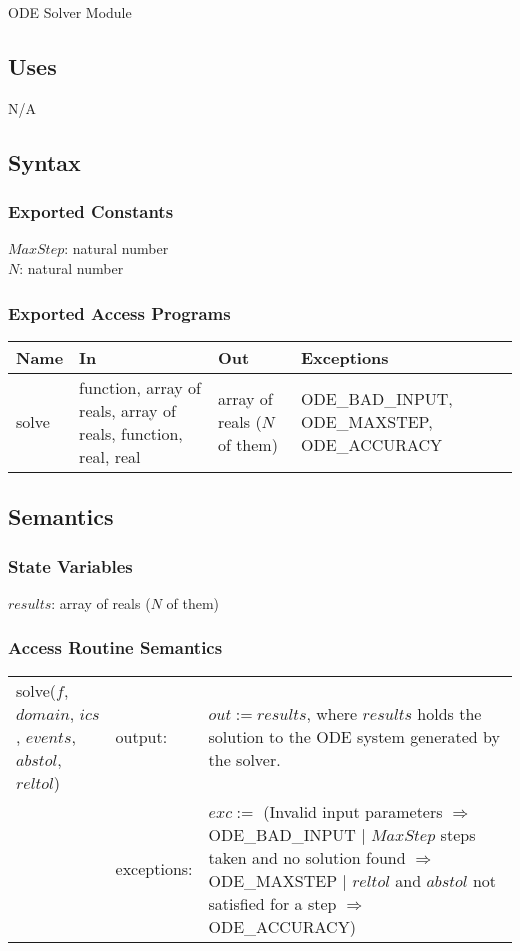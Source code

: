 \documentclass[12pt]{article}
\begin{document}
ODE Solver Module

\subsection{Uses}

N/A

\subsection{Syntax}

\subsubsection{Exported Constants}

$MaxStep$: natural number \\
$N$: natural number

\subsubsection{Exported Access Programs}

\begin{center}
\begin{tabular}{p{2cm} p{4cm} p{4cm} p{4cm}}
\hline
\textbf{Name} & \textbf{In} & \textbf{Out} & \textbf{Exceptions} \\
\hline
solve & function, array of reals, array of reals, function, real, real & array of reals ($N$ of them) & ODE\_BAD\_INPUT, ODE\_MAXSTEP, ODE\_ACCURACY \\
\hline 
\end{tabular}
\end{center}

\subsection{Semantics}

\subsubsection{State Variables}

$results$: array of reals ($N$ of them)

\subsubsection{Access Routine Semantics}

\begin{center}
\begin{tabular}{l l p{5cm}}
solve($f$, $domain$, $ics$, $events$, $abstol$, $reltol$) & output: & $out := results$, where $results$ holds the solution to the ODE system generated by the solver. \\
& exceptions: & $exc :=$ (Invalid input parameters $\Rightarrow$ ODE\_BAD\_INPUT $|$ $MaxStep$ steps taken and no solution found $\Rightarrow$ ODE\_MAXSTEP $|$ $reltol$ and $abstol$ not satisfied for a step $\Rightarrow$ ODE\_ACCURACY)  \\
\end{tabular}
\end{center}
\end{document}
